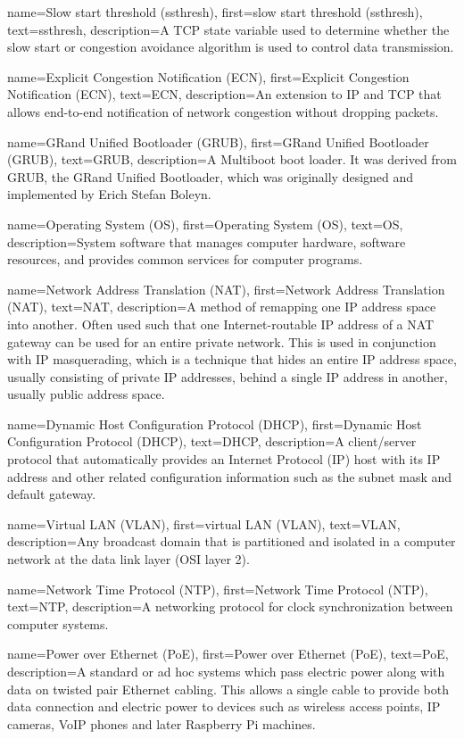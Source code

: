 {
    name={Slow start threshold (ssthresh)},
    first={slow start threshold (ssthresh)},
    text={ssthresh},
    description={A TCP state variable used to determine whether the slow start or congestion avoidance algorithm is used to control data transmission.}
}

{
    name={Explicit Congestion Notification (ECN)},
    first={Explicit Congestion Notification (ECN)},
    text={ECN},
    description={An extension to IP and TCP that allows end-to-end notification of network congestion without dropping packets.}
}

{
    name={GRand Unified Bootloader (GRUB)},
    first={GRand Unified Bootloader (GRUB)},
    text={GRUB},
    description={A Multiboot boot loader. It was derived from GRUB, the GRand Unified Bootloader, which was originally designed and implemented by Erich Stefan Boleyn.}
}

{
    name={Operating System (OS)},
    first={Operating System (OS)},
    text={OS},
    description={System software that manages computer hardware, software resources, and provides common services for computer programs.}
}

{
    name={Network Address Translation (NAT)},
    first={Network Address Translation (NAT)},
    text={NAT},
    description={A method of remapping one IP address space into another. Often used such that one Internet-routable IP address of a NAT gateway can be used for an entire private network. This is used in conjunction with IP masquerading, which is a technique that hides an entire IP address space, usually consisting of private IP addresses, behind a single IP address in another, usually public address space.}
}

{
    name={Dynamic Host Configuration Protocol (DHCP)},
    first={Dynamic Host Configuration Protocol (DHCP)},
    text={DHCP},
    description={A client/server protocol that automatically provides an Internet Protocol (IP) host with its IP address and other related configuration information such as the subnet mask and default gateway.}
}

{
    name={Virtual LAN (VLAN)},
    first={virtual LAN (VLAN)},
    text={VLAN},
    description={Any broadcast domain that is partitioned and isolated in a computer network at the data link layer (OSI layer 2).}
}

{
    name={Network Time Protocol (NTP)},
    first={Network Time Protocol (NTP)},
    text={NTP},
    description={A networking protocol for clock synchronization between computer systems.}
}

{
    name={Power over Ethernet (PoE)},
    first={Power over Ethernet (PoE)},
    text={PoE},
    description={A standard or ad hoc systems which pass electric power along with data on twisted pair Ethernet cabling. This allows a single cable to provide both data connection and electric power to devices such as wireless access points, IP cameras, VoIP phones and later Raspberry Pi machines.}
}